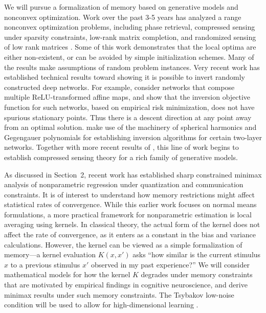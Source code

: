 We will pursue a formalization of memory based on generative models
and nonconvex optimization. Work over the past 3-5 years has analyzed a range nonconvex
optimization problems, including phase retrieval, compressed
sensing under sparsity constraints, low-rank matrix
completion, and randomized sensing of low rank matrices
\citep{phaselift1,phaselift2,phaselift3,ZhaWanLiu15,WeiCaiCha16,ZheLaf15}.
Some of this work demonstrates that the local optima are either
non-existent, or can be avoided by simple initialization schemes. Many
of the results make assumptions of random problem instances.  Very
recent work has established technical results toward showing it is
possible to invert randomly constructed deep networks. For example,
\cite{HandV17} consider networks that compose multiple ReLU-transformed affine
maps, and show that the inversion objective function for such networks, based
on empirical risk minimization, does not have spurious stationary
points. Thus there is a descent direction at any point away from an optimal solution.
\cite{Mixon18} make use of the machinery of spherical harmonics and Gegengauer polynomials for
establishing inversion algorithms for certain two-layer
networks. Together with more recent results of \cite{HandV18}, this
line of work begins to establish compressed sensing theory for a rich
family of generative models.


As discussed in Section~2, recent work has established 
sharp constrained minimax analysis of nonparametric
regression under quantization and communication
constraints.
It is of interest to understand how memory restrictions might affect
statistical rates of convergence. While this earlier work focuses on
normal means formulations, a more practical framework for
nonparametric estimation is local averaging using kernels. In
classical theory, the actual form of the kernel does not affect the
rate of convergence, as it enters as a constant in the bias and
variance calculations. However, the kernel can be viewed as a
simple formalization of memory---a kernel evaluation $K(x,x')$ asks
``how similar is the current stimulus $x$ to a previous stimulus $x'$
observed in my past experience?'' We will consider mathematical models for
how the kernel $K$ degrades under memory constraints that
are motivated by empirical findings in cognitive neuroscience,
and derive minimax results under such memory constraints. The
Tsybakov low-noise condition will be used to allow for
high-dimensional learning \citep{mammen1999,tsybakov2004,audibert2007}.



